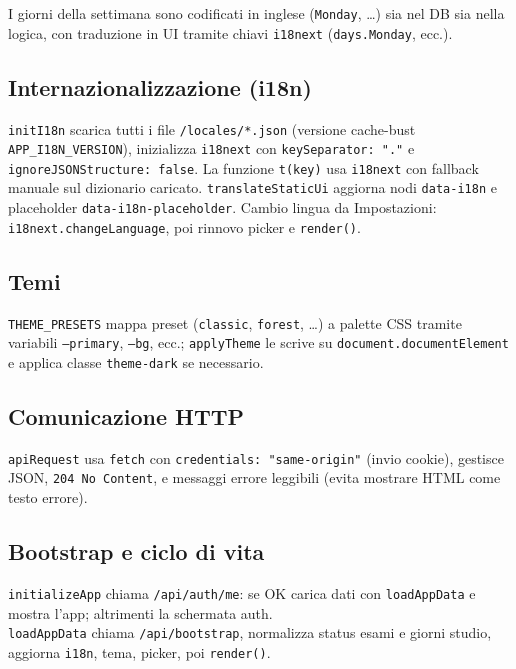 \documentclass[11pt,a4paper]{article}
\begin{document}
I giorni della settimana sono codificati in inglese (\texttt{Monday}, \ldots) sia nel DB sia nella logica, con traduzione in UI tramite chiavi \texttt{i18next} (\texttt{days.Monday}, ecc.).

\subsection{Internazionalizzazione (i18n)}
\texttt{initI18n} scarica tutti i file \texttt{/locales/*.json} (versione cache-bust \texttt{APP\_I18N\_VERSION}), inizializza \texttt{i18next} con \texttt{keySeparator: "."} e \texttt{ignoreJSONStructure: false}. La funzione \texttt{t(key)} usa \texttt{i18next} con fallback manuale sul dizionario caricato. \texttt{translateStaticUi} aggiorna nodi \texttt{data-i18n} e placeholder \texttt{data-i18n-placeholder}. Cambio lingua da Impostazioni: \texttt{i18next.changeLanguage}, poi rinnovo picker e \texttt{render()}.

\subsection{Temi}
\texttt{THEME\_PRESETS} mappa preset (\texttt{classic}, \texttt{forest}, \ldots) a palette CSS tramite variabili \texttt{--primary}, \texttt{--bg}, ecc.; \texttt{applyTheme} le scrive su \texttt{document.documentElement} e applica classe \texttt{theme-dark} se necessario.

\subsection{Comunicazione HTTP}
\texttt{apiRequest} usa \texttt{fetch} con \texttt{credentials: "same-origin"} (invio cookie), gestisce JSON, \texttt{204 No Content}, e messaggi errore leggibili (evita mostrare HTML come testo errore).

\subsection{Bootstrap e ciclo di vita}
\texttt{initializeApp} chiama \texttt{/api/auth/me}: se OK carica dati con \texttt{loadAppData} e mostra l'app; altrimenti la schermata auth.\\
\texttt{loadAppData} chiama \texttt{/api/bootstrap}, normalizza status esami e giorni studio, aggiorna \texttt{i18n}, tema, picker, poi \texttt{render()}.
\end{document}

